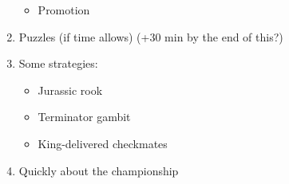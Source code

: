 \begin{enumerate}
\begin{itemize}
	        \item Promotion
	    \end{itemize}
	\item Puzzles (if time allows) (+30 min by the end of this?)
	\item Some strategies:
		\begin{itemize}
			\item Jurassic rook
			\item Terminator gambit
			\item King-delivered checkmates
		\end{itemize}
	\item Quickly about the championship
\end{enumerate}






\printbibliography

